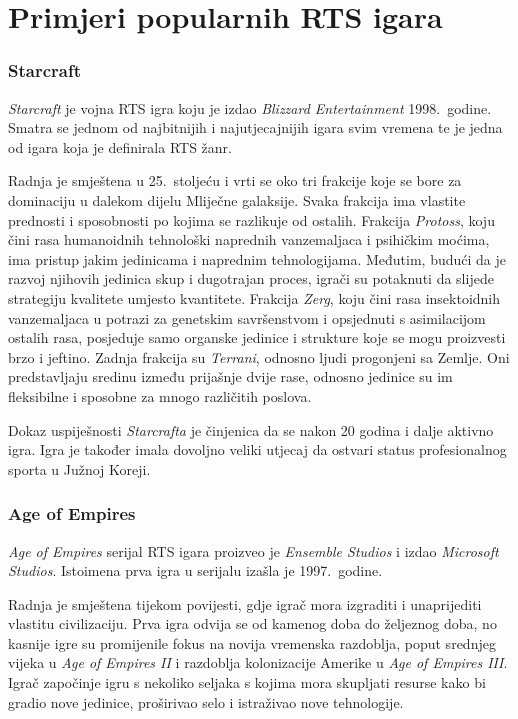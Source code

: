 \documentclass[times, utf8, zavrsni, numeric]{fer}
\begin{document}
\section{Primjeri popularnih RTS igara}

\subsubsection{Starcraft}
\par \textit{Starcraft} je vojna RTS igra koju je izdao \textit{Blizzard Entertainment} 1998.\ godine. 
Smatra se jednom od najbitnijih i najutjecajnijih igara svim vremena te je jedna od igara koja je definirala RTS žanr.

\par Radnja je smještena u 25.\ stoljeću i vrti se oko tri frakcije koje se bore za dominaciju u dalekom dijelu Mliječne galaksije. 
Svaka frakcija ima vlastite prednosti i sposobnosti po kojima se razlikuje od ostalih. 
Frakcija \textit{Protoss}, koju čini rasa humanoidnih tehnološki naprednih vanzemaljaca i psihičkim moćima, ima pristup jakim jedinicama i naprednim tehnologijama.
Međutim, budući da je razvoj njihovih jedinica skup i dugotrajan proces, igrači su potaknuti da slijede strategiju kvalitete umjesto kvantitete.
Frakcija \textit{Zerg}, koju čini rasa insektoidnih vanzemaljaca u potrazi za genetskim savršenstvom i opsjednuti s asimilacijom ostalih rasa, posjeduje samo organske jedinice i strukture koje se mogu proizvesti brzo i jeftino.
Zadnja frakcija su \textit{Terrani}, odnosno ljudi progonjeni sa Zemlje.
Oni predstavljaju sredinu između prijašnje dvije rase, odnosno jedinice su im fleksibilne i sposobne za mnogo različitih poslova.

\par Dokaz uspiješnosti \textit{Starcrafta} je činjenica da se nakon 20 godina i dalje aktivno igra.
Igra je također imala dovoljno veliki utjecaj da ostvari status profesionalnog sporta u Južnoj Koreji.

\subsubsection{Age of Empires}

\par \textit{Age of Empires} serijal RTS igara proizveo je \textit{Ensemble Studios} i izdao \textit{Microsoft Studios}. 
Istoimena prva igra u serijalu izašla je 1997.\ godine.

\par Radnja je smještena tijekom povijesti, gdje igrač mora izgraditi i unaprijediti vlastitu civilizaciju.
Prva igra odvija se od kamenog doba do željeznog doba, no kasnije igre su promijenile fokus na novija vremenska razdoblja, poput srednjeg vijeka u \textit{Age of Empires II} i razdoblja kolonizacije Amerike u \textit{Age of Empires III}.
Igrač započinje igru s nekoliko seljaka s kojima mora skupljati resurse kako bi gradio nove jedinice, proširivao selo i istraživao nove tehnologije.
\end{document}
